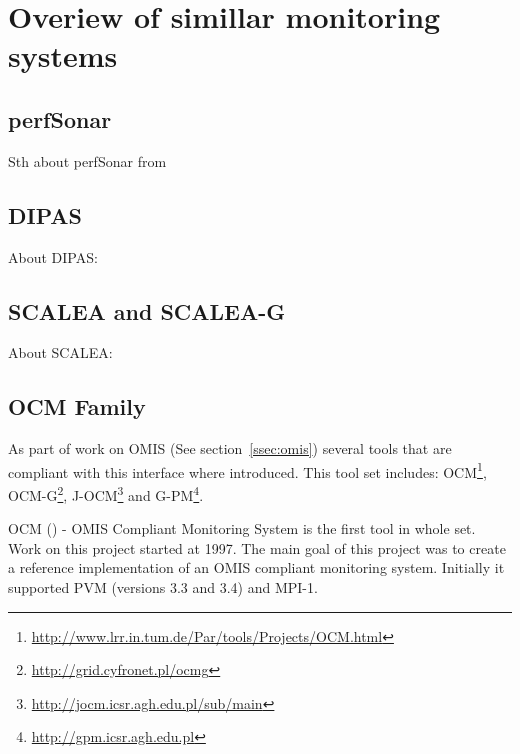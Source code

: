 %
 
 
\section{Overiew of simillar monitoring systems}
\label{sec:ch2_similar}


\subsection{perfSonar}

Sth about perfSonar from\cite{perfSonar1,perfSonar2,perfSonar3}


\subsection{DIPAS}

About DIPAS: \cite{DIPAS}

\subsection{SCALEA and SCALEA-G}

About SCALEA: \cite{SCALEA1,SCALEA2, SCALEA3}

\subsection{OCM Family}

As part of work on OMIS (See section~\ref{ssec:omis}) several tools that are compliant with this interface where introduced. This tool set includes: OCM\footnote{\url{http://www.lrr.in.tum.de/Par/tools/Projects/OCM.html}}, OCM-G\footnote{\url{http://grid.cyfronet.pl/ocmg}}, J-OCM\footnote{\url{http://jocm.icsr.agh.edu.pl/sub/main}} and G-PM\footnote{\url{http://gpm.icsr.agh.edu.pl}}.

OCM (\cite{RWspdt98, RW:ppam99b}) - OMIS Compliant Monitoring System is the first tool in whole set. Work on this project started at 1997. The main goal of this project was to create a reference implementation of an OMIS compliant monitoring system. Initially it supported PVM (versions 3.3 and 3.4) and MPI-1.

